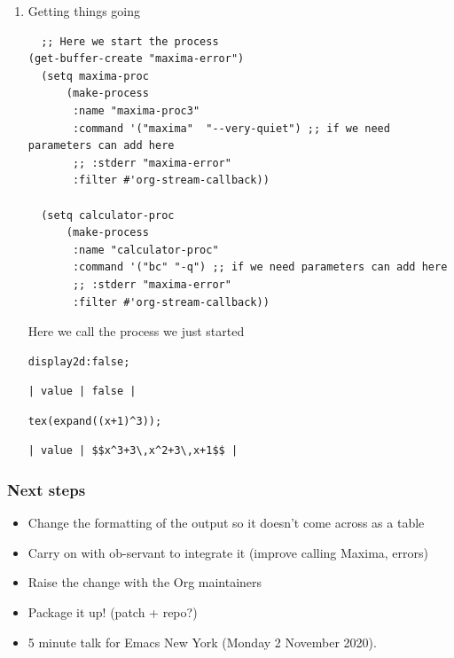 \documentclass[11pt]{article}
\begin{document}
\begin{enumerate}
\item Getting things going
\label{sec:org3baf701}

\begin{verbatim}
  ;; Here we start the process
(get-buffer-create "maxima-error")
  (setq maxima-proc
      (make-process
       :name "maxima-proc3"
       :command '("maxima"  "--very-quiet") ;; if we need parameters can add here
       ;; :stderr "maxima-error"
       :filter #'org-stream-callback))

  (setq calculator-proc
      (make-process
       :name "calculator-proc"
       :command '("bc" "-q") ;; if we need parameters can add here
       ;; :stderr "maxima-error"
       :filter #'org-stream-callback))
\end{verbatim}

Here we call the process we just started

\begin{verbatim}
display2d:false;
\end{verbatim}

\begin{verbatim}
| value | false |
\end{verbatim}

\begin{verbatim}
tex(expand((x+1)^3));
\end{verbatim}

\begin{verbatim}
| value | $$x^3+3\,x^2+3\,x+1$$ |
\end{verbatim}
\end{enumerate}

\subsubsection{Next steps}
\label{sec:org69fd759}

\begin{itemize}
\item Change the formatting of the output so it doesn't come across as a table
\item Carry on with ob-servant to integrate it (improve calling Maxima, errors)
\item Raise the change with the Org maintainers
\item Package it up! (patch + repo?)
\item 5 minute talk for Emacs New York (Monday 2 November 2020).
\end{itemize}
\end{document}
